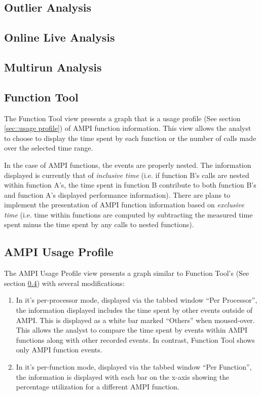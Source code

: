 \documentclass[10pt]{report}
\begin{document}
\subsection{Outlier Analysis}


\subsection{ Online Live Analysis}

\subsection{Multirun Analysis}

\subsection{Function Tool}
\label{sec::function tool}
The Function Tool view presents a graph that is a usage profile (See
section \ref{sec::usage profile}) of AMPI function information. This
view allows the analyst to choose to display the time spent by each
function or the number of calls made over the selected time range.

In the case of AMPI functions, the events are properly nested. The
information displayed is currently that of {\em inclusive time}
(i.e. if function B's calls are nested within function A's, the time
spent in function B contribute to both function B's and function A's
displayed performance information). There are plans to implement the
presentation of AMPI function information based on {\em exclusive
time} (i.e. time within functions are computed by subtracting the
measured time spent minus the time spent by any calls to nested
functions).


\subsection{AMPI Usage Profile}

The AMPI Usage Profile view presents a graph similar to Function
Tool's (See section \ref{sec::function tool}) with several
modifications:

\begin{enumerate}
\item In it's per-processor mode, displayed via the tabbed window
``Per Processor'', the information displayed includes the time spent
by other events outside of AMPI. This is displayed as a white bar
marked ``Others'' when moused-over. This allows the analyst to compare
the time spent by events within AMPI functions along with other
recorded events. In contrast, Function Tool shows only AMPI function
events.
\item In it's per-function mode, displayed via the tabbed window ``Per
Function'', the information is displayed with each bar on the x-axis
showing the percentage utilization for a different AMPI function.
\end{enumerate}
\end{document}

